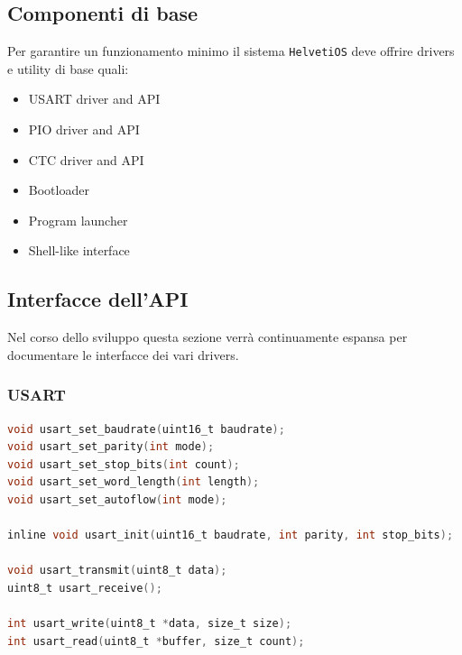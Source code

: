 \documentclass[a4paper, 11pt, twoside]{article}
\begin{document}
\subsection{Componenti di base}

Per garantire un funzionamento minimo il sistema {\tt HelvetiOS} deve offrire
drivers e utility di base quali:

\begin{center}
\begin{minipage}[t]{.4\linewidth}
    \begin{itemize}
        \item USART driver and API
        \item PIO driver and API
        \item CTC driver and API
    \end{itemize}
\end{minipage}%
\begin{minipage}[t]{.4\linewidth}
    \begin{itemize}
        \item Bootloader
        \item Program launcher
        \item Shell-like interface
    \end{itemize}
\end{minipage}
\end{center}

\subsection{Interfacce dell'API} 

Nel corso dello sviluppo questa sezione verr\`a continuamente espansa per
documentare le interfacce dei vari drivers.

\subsubsection{USART}
\begin{lstlisting}[language=C, basicstyle=\ttfamily]
void usart_set_baudrate(uint16_t baudrate);
void usart_set_parity(int mode);
void usart_set_stop_bits(int count);
void usart_set_word_length(int length);
void usart_set_autoflow(int mode);

inline void usart_init(uint16_t baudrate, int parity, int stop_bits); 

void usart_transmit(uint8_t data);
uint8_t usart_receive();

int usart_write(uint8_t *data, size_t size);
int usart_read(uint8_t *buffer, size_t count);
\end{lstlisting}
\end{document}
